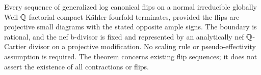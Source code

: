 Every sequence of generalized log canonical flips on a normal irreducible globally Weil \(\mathbb{Q}\)-factorial compact K\"ahler fourfold terminates, provided the flips are projective small diagrams with the stated opposite ample signs. The boundary is rational, and the nef b-divisor is fixed and represented by an analytically nef \(\mathbb{Q}\)-Cartier divisor on a projective modification. No scaling rule or pseudo-effectivity assumption is required. The theorem concerns existing flip sequences; it does not assert the existence of all contractions or flips.
